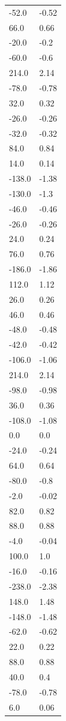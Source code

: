 \begin{longtable}{ll}
-52.0 & -0.52 \\
66.0 & 0.66 \\
-20.0 & -0.2 \\
-60.0 & -0.6 \\
214.0 & 2.14 \\
-78.0 & -0.78 \\
32.0 & 0.32 \\
-26.0 & -0.26 \\
-32.0 & -0.32 \\
84.0 & 0.84 \\
14.0 & 0.14 \\
-138.0 & -1.38 \\
-130.0 & -1.3 \\
-46.0 & -0.46 \\
-26.0 & -0.26 \\
24.0 & 0.24 \\
76.0 & 0.76 \\
-186.0 & -1.86 \\
112.0 & 1.12 \\
26.0 & 0.26 \\
46.0 & 0.46 \\
-48.0 & -0.48 \\
-42.0 & -0.42 \\
-106.0 & -1.06 \\
214.0 & 2.14 \\
-98.0 & -0.98 \\
36.0 & 0.36 \\
-108.0 & -1.08 \\
0.0 & 0.0 \\
-24.0 & -0.24 \\
64.0 & 0.64 \\
-80.0 & -0.8 \\
-2.0 & -0.02 \\
82.0 & 0.82 \\
88.0 & 0.88 \\
-4.0 & -0.04 \\
100.0 & 1.0 \\
-16.0 & -0.16 \\
-238.0 & -2.38 \\
148.0 & 1.48 \\
-148.0 & -1.48 \\
-62.0 & -0.62 \\
22.0 & 0.22 \\
88.0 & 0.88 \\
40.0 & 0.4 \\
-78.0 & -0.78 \\
6.0 & 0.06 \\

\end{longtable}
